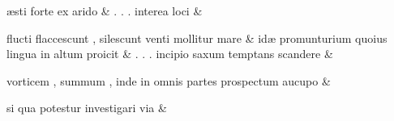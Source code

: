 \documentclass[12pt,onecolumn,twoside,a4paper]{memoir}
\begin{document}
               \begin{pairs}
                  \begin{Leftside}
			\beginnumbering
			\setcounter{stanzaL}{0}
                     
                         \stanza {}
                     æsti
                              forte
                              ex
                              arido \&
                         \stanza {}.
                              .
                              .
                              interea
                              loci & 
                     
                              flucti
                              flaccescunt
                              ,
                              silescunt
                              venti
                              mollitur
                              mare \&
                         \stanza {}
                     idæ
                              promunturium
                              quoius
                              lingua
                              in
                              altum
                              proicit \&
                         \stanza {}.
                              .
                              .
                              incipio
                              saxum
                              temptans
                              scandere & 
                     
                              vorticem
                              ,
                              summum
                              ,
                              inde
                              in
                              omnis
                              partes
                              prospectum
                              aucupo \&
                         \stanza {}
                     
                              si
                              qua
                              potestur
                              investigari
                              via \&
                         \stanza {}
                     

\end{Leftside}
\end{pairs}
\end{document}
